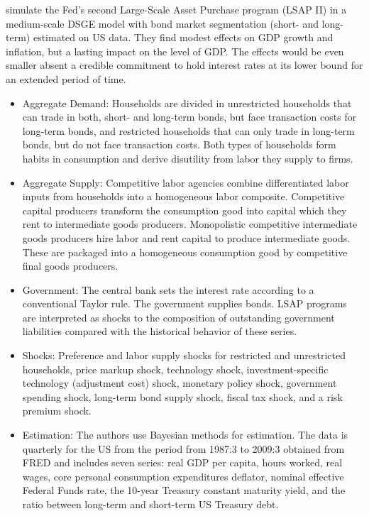 \documentclass[11pt,a4paper]{article}
\begin{document}
	\cite{chen2012macroeconomic} simulate the Fed's second Large-Scale Asset Purchase program (LSAP II) in a medium-scale DSGE model with bond market segmentation (short- and long-term) estimated on US data. They find modest effects on GDP growth and inflation, but a lasting impact on the level of GDP. The effects would be even smaller absent a credible commitment to hold interest rates at its lower bound for an extended period of time.
	
	\begin{itemize}
		\item Aggregate Demand: Households are divided in unrestricted households that can trade in both, short- and long-term bonds, but face transaction costs for long-term bonds, and restricted households that can only trade in long-term bonds, but do not face transaction costs. Both types of households form habits in consumption and derive disutility from labor they supply to firms.
		
		\item Aggregate Supply: Competitive labor agencies combine differentiated labor inputs from households into a homogeneous labor composite. Competitive capital producers transform the consumption good into capital which they rent to intermediate goods producers. Monopolistic competitive intermediate goods producers hire labor and rent capital to produce intermediate goods. These are packaged into a homogeneous consumption good by competitive final goods producers.
		
		\item Government: The central bank sets the interest rate according to a conventional Taylor rule. The government supplies bonds. LSAP programs are interpreted as shocks to the composition of outstanding government liabilities compared with the historical behavior of these series.
		
		\item Shocks: Preference and labor supply shocks for restricted and unrestricted households, price markup shock, technology shock, investment-specific technology (adjustment cost) shock,  monetary policy shock, government spending shock, long-term bond supply shock, fiscal tax shock, and a risk premium shock.
		
		\item Estimation: The authors use Bayesian methods for estimation. The data is quarterly for the US from the period from 1987:3 to 2009:3 obtained from FRED and includes seven series: real GDP per capita, hours worked, real wages, core personal consumption expenditures deflator, nominal effective Federal Funds rate, the 10-year Treasury constant maturity yield, and the ratio between long-term and short-term US Treasury debt.
	\end{itemize}
	
\end{document}
